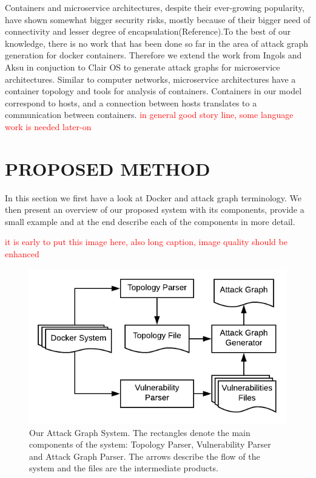 \documentclass[letterpaper, 10 pt, conference]{ieeeconf}  %
\newcommand\todo[1]{\textcolor{red}{#1}}                                     %
\begin{document}
Containers and microservice architectures, despite their ever-growing popularity, have shown somewhat bigger security risks, mostly because of their bigger need of connectivity and lesser degree of encapsulation(Reference).To the best of our knowledge, there is no work that has been done so far in the area of attack graph generation for docker containers. Therefore we extend the work from Ingols\cite{ingols} and Aksu\cite{aksu} in conjuction to Clair OS to generate attack graphs for microservice architectures. Similar to computer networks, microservice architectures have a container topology and tools for analysis of containers. Containers in our model correspond to hosts, and a connection between hosts translates to a communication between containers. 
\todo{in general good story line, some language work is needed later-on}
\section{PROPOSED METHOD}


In this section we first have a look at Docker and attack graph terminology. We then present an overview of our proposed system with its components, provide a small example and at the end describe each of the components in more detail. 

\todo{it is early to put this image here, also long caption, image quality should be enhanced}
\begin{figure}
	\includegraphics[width=\textwidth]{AttackGraphSystem}
	\caption{Our Attack Graph System. The rectangles denote the main components of the system: Topology Parser, Vulnerability Parser and Attack Graph Parser. The arrows describe the flow of the system and the files are the intermediate products.}
	\label{AttackGraphSystem}
\end{figure}
\end{document}
